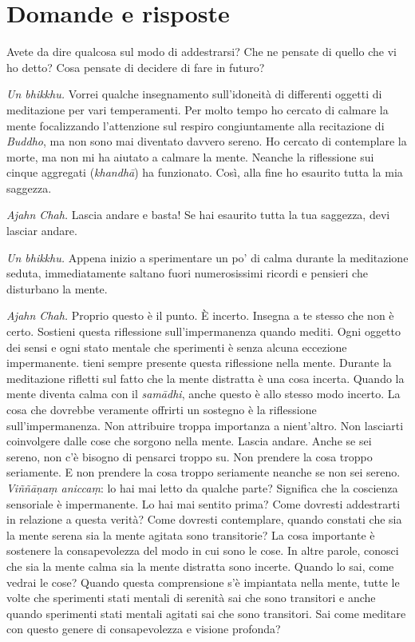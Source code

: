 \section{Domande e risposte}

Avete da dire qualcosa sul modo di addestrarsi? Che ne pensate di quello
che vi ho detto? Cosa pensate di decidere di fare in futuro?

\emph{Un bhikkhu.} Vorrei qualche insegnamento sull'idoneità di
differenti oggetti di meditazione per vari temperamenti. Per molto tempo
ho cercato di calmare la mente focalizzando l'attenzione sul respiro
congiuntamente alla recitazione di \emph{Buddho}, ma non sono mai
diventato davvero sereno. Ho cercato di contemplare la morte, ma non mi
ha aiutato a calmare la mente. Neanche la riflessione sui cinque
aggregati (\emph{khandhā}) ha funzionato. Così, alla fine ho esaurito
tutta la mia saggezza.

\emph{Ajahn Chah.} Lascia andare e basta! Se hai esaurito tutta la tua
saggezza, devi lasciar andare.

\emph{Un bhikkhu.} Appena inizio a sperimentare un po' di calma durante
la meditazione seduta, immediatamente saltano fuori numerosissimi
ricordi e pensieri che disturbano la mente.

\emph{Ajahn Chah.} Proprio questo è il punto. È incerto. Insegna a te stesso
che non è certo. Sostieni questa riflessione sull'impermanenza quando
mediti. Ogni oggetto dei sensi e ogni stato mentale che sperimenti è
senza alcuna eccezione impermanente. tieni sempre presente questa
riflessione nella mente. Durante la meditazione rifletti sul fatto che
la mente distratta è una cosa incerta. Quando la mente diventa calma con
il \emph{samādhi}, anche questo è allo stesso modo incerto. La cosa che
dovrebbe veramente offrirti un sostegno è la riflessione
sull'impermanenza. Non attribuire troppa importanza a nient'altro. Non
lasciarti coinvolgere dalle cose che sorgono nella mente. Lascia andare.
Anche se sei sereno, non c'è bisogno di pensarci troppo su. Non prendere
la cosa troppo seriamente. E non prendere la cosa troppo seriamente
neanche se non sei sereno. \emph{Viññāṇaṃ aniccaṃ}: lo hai mai letto da
qualche parte? Significa che la coscienza sensoriale è impermanente. Lo
hai mai sentito prima? Come dovresti addestrarti in relazione a questa
verità? Come dovresti contemplare, quando constati che sia la mente
serena sia la mente agitata sono transitorie? La cosa importante è
sostenere la consapevolezza del modo in cui sono le cose. In altre
parole, conosci che sia la mente calma sia la mente distratta sono
incerte. Quando lo sai, come vedrai le cose? Quando questa comprensione
s'è impiantata nella mente, tutte le volte che sperimenti stati mentali
di serenità sai che sono transitori e anche quando sperimenti stati
mentali agitati sai che sono transitori. Sai come meditare con questo
genere di consapevolezza e visione profonda?

